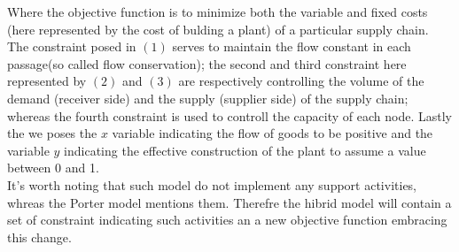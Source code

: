 \documentclass{article}
\begin{document}
Where the objective function  is to minimize both the variable and fixed costs (here represented by the cost of bulding a plant) of a particular supply chain.
The constraint posed in $(1)$ serves to maintain the flow constant in each passage(so called flow conservation); the second and third constraint here represented by $(2)$ and $(3)$ are respectively controlling the volume of the demand (receiver side) and the supply (supplier side) of the supply chain; whereas the fourth constraint is used to controll the capacity of each node. Lastly the we poses the $x$ variable indicating the flow of goods to be positive and the variable $y$ indicating the effective construction of the plant to assume a value between 0 and 1. 
\\
It's worth noting that such model do not implement any support activities, whreas the Porter model mentions them. Therefre the hibrid model will contain a set of constraint indicating such activities an a new objective function embracing this change.
\end{document}
